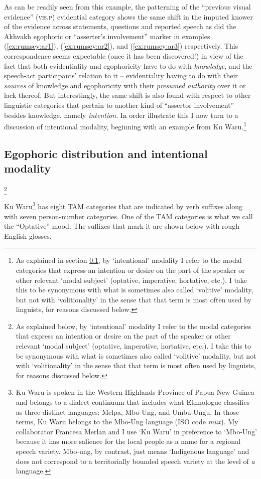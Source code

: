 \documentclass[output=paper]{langsci/langscibook}
\begin{document}
As can be readily seen from this example, the patterning of the “previous visual evidence” (\textsc{vis}.\textsc{p}) evidential category shows the same shift in the imputed knower of the evidence across statements, questions and reported speech as did the Akhvakh egophoric or “asserter’s involvement” marker in examples (\ref{ex:rumsey:ar1}), (\ref{ex:rumsey:ar2}), and (\ref{ex:rumsey:ar3}) respectively. This correspondence seems expectable (once it has been discovered!) in view of the fact that both evidentiality and egophoricity have to do with \textit{knowledge}, and the speech-act participants’ relation to it – evidentiality having to do with their \textit{sources} of knowledge and egophoricity with their \textit{presumed authority} over it or lack thereof. But interestingly, the same shift is also found with respect to other linguistic categories that pertain to another kind of “assertor involvement” besides knowledge, namely \textit{intention}. In order illustrate this I now turn to a discussion of intentional modality, beginning with an example from Ku Waru.\footnote{As explained in section \ref{s:ar2-2}, by ‘intentional’ modality I refer to the modal categories that express an intention or desire on the part of the speaker or other relevant ‘modal subject’ (optative, imperative, hortative, etc.). I take this to be synonymous with what is sometimes also called ‘volitive’ modality, but not with ‘volitionality’ in the sense that that term is most often used by linguists, for reasons discussed below.}


\subsection{Egophoric distribution and intentional modality}\label{s:ar2-2}

\footnote{As explained below, by ‘intentional’ modality I refer to the modal categories that express an intention or desire on the part of the speaker or other relevant ‘modal subject’ (optative, imperative, hortative, etc.). I take this to be synonymous with what is sometimes also called ‘volitive’ modality, but not with ‘volitionality’ in the sense that that term is most often used by linguists, for reasons discussed below.}

Ku Waru\footnote{Ku Waru is spoken in the Western Highlands Province of Papua New Guinea and belongs to a dialect continuum that includes what Ethnologue classifies as three distinct languages: Melpa, Mbo-Ung, and Umbu-Ungu. In those terms, Ku Waru belongs to the Mbo-Ung language (ISO code \textit{mux}). My collaborator Francesa Merlan and I use ‘Ku Waru’ in preference to ‘Mbo-Ung’ because it has more salience for the local people as a name for a regional speech variety. Mbo-ung, by contrast, just means ‘Indigenous language’ and does not correspond to a territorially bounded speech variety at the level of \textit{a} language.} has eight TAM categories that are indicated by verb suffixes along with seven person-number categories. One of the TAM categories is what we call the “Optative” mood. The suffixes that mark it are shown below with rough English glosses.
\end{document}
